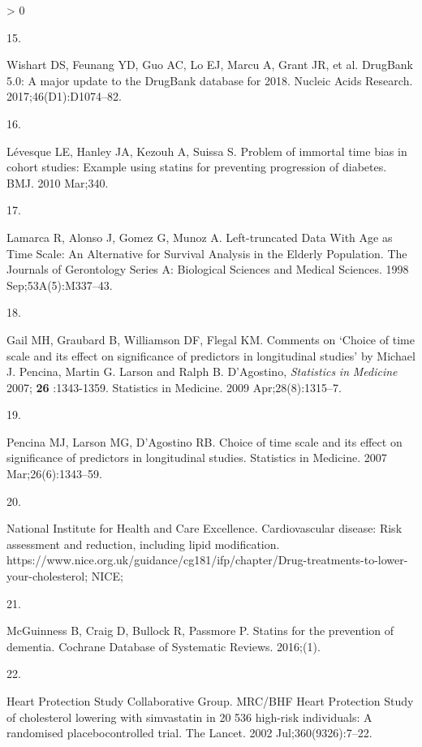 \documentclass[
]{article}
\newlength{\cslhangindent}
\newlength{\csllabelwidth}
\newenvironment{CSLReferences}[2] %
 {%
  \setlength{\parindent}{0pt}
  \ifodd #1 \everypar{\setlength{\hangindent}{\cslhangindent}}\ignorespaces\fi
  \ifnum #2 > 0
  \setlength{\parskip}{#2\baselineskip}
  \fi
 }%
 {}
\newcommand{\CSLLeftMargin}[1]{\parbox[t]{\csllabelwidth}{#1}}
\newcommand{\CSLRightInline}[1]{\parbox[t]{\linewidth - \csllabelwidth}{#1}\break}
\begin{document}
\begin{CSLReferences}{0}{0}
\leavevmode\hypertarget{ref-wishart2017}{}%
\CSLLeftMargin{15. }
\CSLRightInline{Wishart DS, Feunang YD, Guo AC, Lo EJ, Marcu A, Grant JR, et al. {DrugBank} 5.0: A major update to the {DrugBank} database for 2018. Nucleic Acids Research. 2017;46(D1):D1074--82. }

\leavevmode\hypertarget{ref-levesque2010}{}%
\CSLLeftMargin{16. }
\CSLRightInline{Lévesque LE, Hanley JA, Kezouh A, Suissa S. Problem of immortal time bias in cohort studies: Example using statins for preventing progression of diabetes. BMJ. 2010 Mar;340. }

\leavevmode\hypertarget{ref-lamarca1998}{}%
\CSLLeftMargin{17. }
\CSLRightInline{Lamarca R, Alonso J, Gomez G, Munoz A. Left-truncated {Data With Age} as {Time Scale}: {An Alternative} for {Survival Analysis} in the {Elderly Population}. The Journals of Gerontology Series A: Biological Sciences and Medical Sciences. 1998 Sep;53A(5):M337--43. }

\leavevmode\hypertarget{ref-gail2009}{}%
\CSLLeftMargin{18. }
\CSLRightInline{Gail MH, Graubard B, Williamson DF, Flegal KM. Comments on {`{Choice} of time scale and its effect on significance of predictors in longitudinal studies'} by {Michael J}. {Pencina}, {Martin G}. {Larson} and {Ralph B}. {D}'{Agostino}, {\emph{Statistics}}{ \emph{in} }{\emph{Medicine}} 2007; {\textbf{26}} :1343-1359. Statistics in Medicine. 2009 Apr;28(8):1315--7. }

\leavevmode\hypertarget{ref-pencina2007}{}%
\CSLLeftMargin{19. }
\CSLRightInline{Pencina MJ, Larson MG, D'Agostino RB. Choice of time scale and its effect on significance of predictors in longitudinal studies. Statistics in Medicine. 2007 Mar;26(6):1343--59. }

\leavevmode\hypertarget{ref-nationalinstituteforhealthandcareexcellence}{}%
\CSLLeftMargin{20. }
\CSLRightInline{National Institute for Health and Care Excellence. Cardiovascular disease: Risk assessment and reduction, including lipid modification. https://www.nice.org.uk/guidance/cg181/ifp/chapter/Drug-treatments-to-lower-your-cholesterol; {NICE}; }

\leavevmode\hypertarget{ref-mcguinness2016a}{}%
\CSLLeftMargin{21. }
\CSLRightInline{McGuinness B, Craig D, Bullock R, Passmore P. Statins for the prevention of dementia. Cochrane Database of Systematic Reviews. 2016;(1). }

\leavevmode\hypertarget{ref-heartprotectionstudycollaborativegroup2002}{}%
\CSLLeftMargin{22. }
\CSLRightInline{Heart Protection Study Collaborative Group. {MRC}/{BHF Heart Protection Study} of cholesterol lowering with simvastatin in 20 536 high-risk individuals: A randomised placebocontrolled trial. The Lancet. 2002 Jul;360(9326):7--22. }


\end{CSLReferences}
\end{document}
